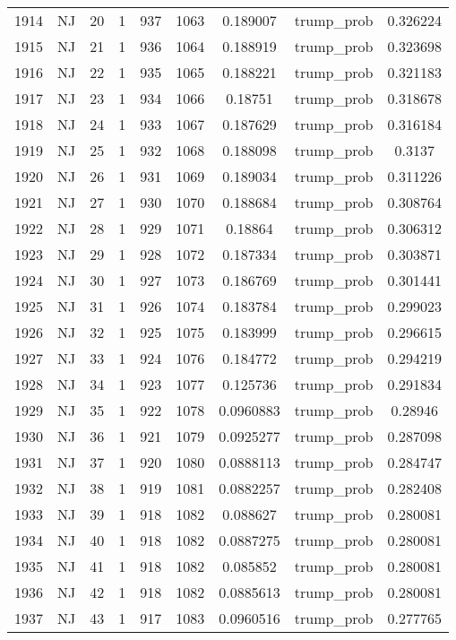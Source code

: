 \documentclass[12pt,a4paper]{article}
\begin{document}
\begin{tabular}{r|cccccccc}
	1914 & NJ & 20 & 1 & 937 & 1063 & 0.189007 & trump\_prob & 0.326224 \\
	1915 & NJ & 21 & 1 & 936 & 1064 & 0.188919 & trump\_prob & 0.323698 \\
	1916 & NJ & 22 & 1 & 935 & 1065 & 0.188221 & trump\_prob & 0.321183 \\
	1917 & NJ & 23 & 1 & 934 & 1066 & 0.18751 & trump\_prob & 0.318678 \\
	1918 & NJ & 24 & 1 & 933 & 1067 & 0.187629 & trump\_prob & 0.316184 \\
	1919 & NJ & 25 & 1 & 932 & 1068 & 0.188098 & trump\_prob & 0.3137 \\
	1920 & NJ & 26 & 1 & 931 & 1069 & 0.189034 & trump\_prob & 0.311226 \\
	1921 & NJ & 27 & 1 & 930 & 1070 & 0.188684 & trump\_prob & 0.308764 \\
	1922 & NJ & 28 & 1 & 929 & 1071 & 0.18864 & trump\_prob & 0.306312 \\
	1923 & NJ & 29 & 1 & 928 & 1072 & 0.187334 & trump\_prob & 0.303871 \\
	1924 & NJ & 30 & 1 & 927 & 1073 & 0.186769 & trump\_prob & 0.301441 \\
	1925 & NJ & 31 & 1 & 926 & 1074 & 0.183784 & trump\_prob & 0.299023 \\
	1926 & NJ & 32 & 1 & 925 & 1075 & 0.183999 & trump\_prob & 0.296615 \\
	1927 & NJ & 33 & 1 & 924 & 1076 & 0.184772 & trump\_prob & 0.294219 \\
	1928 & NJ & 34 & 1 & 923 & 1077 & 0.125736 & trump\_prob & 0.291834 \\
	1929 & NJ & 35 & 1 & 922 & 1078 & 0.0960883 & trump\_prob & 0.28946 \\
	1930 & NJ & 36 & 1 & 921 & 1079 & 0.0925277 & trump\_prob & 0.287098 \\
	1931 & NJ & 37 & 1 & 920 & 1080 & 0.0888113 & trump\_prob & 0.284747 \\
	1932 & NJ & 38 & 1 & 919 & 1081 & 0.0882257 & trump\_prob & 0.282408 \\
	1933 & NJ & 39 & 1 & 918 & 1082 & 0.088627 & trump\_prob & 0.280081 \\
	1934 & NJ & 40 & 1 & 918 & 1082 & 0.0887275 & trump\_prob & 0.280081 \\
	1935 & NJ & 41 & 1 & 918 & 1082 & 0.085852 & trump\_prob & 0.280081 \\
	1936 & NJ & 42 & 1 & 918 & 1082 & 0.0885613 & trump\_prob & 0.280081 \\
	1937 & NJ & 43 & 1 & 917 & 1083 & 0.0960516 & trump\_prob & 0.277765 \\

\end{tabular}
\end{document}

